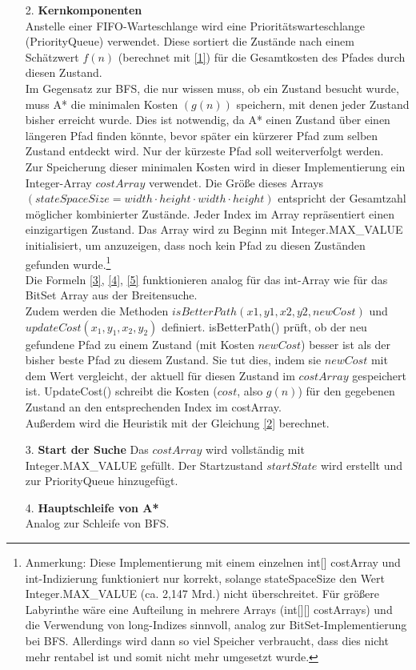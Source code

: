 \documentclass[a4paper,10pt,ngerman]{scrartcl}
\begin{document}
\begin{enumerate}
  \item [2.] \textbf{Kernkomponenten}\\
      Anstelle einer FIFO-Warteschlange wird eine Prioritätswarteschlange (PriorityQueue) verwendet. Diese sortiert die Zustände nach einem Schätzwert $f(n)$ (berechnet mit \ref{1}) für die Gesamtkosten des Pfades durch diesen Zustand. \\
          Im Gegensatz zur BFS, die nur wissen muss, ob ein Zustand besucht wurde, muss A* die minimalen Kosten $(g(n))$ speichern, mit denen jeder Zustand bisher erreicht wurde. Dies ist notwendig, da A* einen Zustand über einen längeren Pfad finden könnte, bevor später ein kürzerer Pfad zum selben Zustand entdeckt wird. Nur der kürzeste Pfad soll weiterverfolgt werden. \\
      Zur Speicherung dieser minimalen Kosten wird in dieser Implementierung ein Integer-Array $costArray$ verwendet. Die Größe dieses Arrays $(stateSpaceSize = width \cdot height \cdot width \cdot height)$ entspricht der Gesamtzahl möglicher kombinierter Zustände. Jeder Index im Array repräsentiert einen einzigartigen Zustand. Das Array wird zu Beginn mit Integer.MAX\_VALUE initialisiert, um anzuzeigen, dass noch kein Pfad zu diesen Zuständen gefunden wurde.\footnote{Anmerkung: Diese Implementierung mit einem einzelnen int[] costArray und int-Indizierung funktioniert nur korrekt, solange stateSpaceSize den Wert Integer.MAX\_VALUE (ca. 2,147 Mrd.) nicht überschreitet. Für größere Labyrinthe wäre eine Aufteilung in mehrere Arrays (int[][] costArrays) und die Verwendung von long-Indizes sinnvoll, analog zur BitSet-Implementierung bei BFS. Allerdings wird dann so viel Speicher verbraucht, dass dies nicht mehr rentabel ist und somit nicht mehr umgesetzt wurde.} 
    \\
    Die Formeln \ref{3}, \ref{4}, \ref{5} funktionieren analog für das int-Array wie für das BitSet Array aus der Breitensuche. \\
    Zudem werden die Methoden $isBetterPath(x1, y1, x2, y2, newCost)$ und $updateCost(x_1, y_1, x_2, y_2)$ definiert. isBetterPath() prüft, ob der neu gefundene Pfad zu einem Zustand (mit Kosten $newCost$) besser ist als der bisher beste Pfad zu diesem Zustand. Sie tut dies, indem sie $newCost$ mit dem Wert vergleicht, der aktuell für diesen Zustand im $costArray$ gespeichert ist. UpdateCost() schreibt die Kosten ($cost$, also $g(n)$) für den gegebenen Zustand an den entsprechenden Index im costArray. \\
    Außerdem wird die Heuristik mit der Gleichung \ref{2} berechnet. 
  \item[3.] \textbf{Start der Suche}
      Das $costArray$ wird vollständig mit Integer.MAX\_VALUE gefüllt. Der Startzustand $startState$ wird erstellt und zur PriorityQueue hinzugefügt. 
  \item[4.] \textbf{Hauptschleife von A*}\\
  Analog zur Schleife von BFS.
\end{enumerate}
\end{document}
